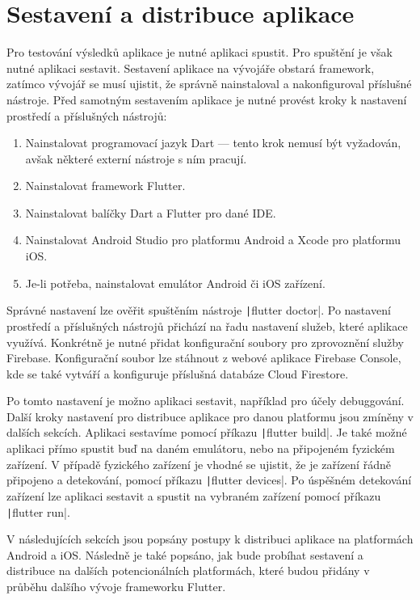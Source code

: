 \chapter{Sestavení a distribuce aplikace}
\label{chap:deployment}

Pro testování výsledků aplikace je nutné aplikaci spustit.
Pro spuštění je však nutné aplikaci sestavit.
Sestavení aplikace na vývojáře obstará framework,
zatímco vývojář se musí ujistit,
že správně nainstaloval a nakonfiguroval příslušné nástroje.
Před samotným sestavením aplikace je nutné provést kroky k nastavení prostředí
a příslušných nástrojů:

\begin{enumerate}
    \item Nainstalovat programovací jazyk Dart
    --- tento krok nemusí být vyžadován,
    avšak některé externí nástroje s ním pracují.
    \item Nainstalovat framework Flutter.
    \item Nainstalovat balíčky Dart a Flutter pro dané IDE.
    \item Nainstalovat Android Studio pro platformu Android
    a Xcode pro platformu iOS.
    \item Je-li potřeba, nainstalovat emulátor Android či iOS zařízení.
\end{enumerate}

Správné nastavení lze ověřit spuštěním nástroje
\texttt|flutter doctor|.
Po nastavení prostředí a příslušných nástrojů přichází na řadu nastavení služeb,
které aplikace využívá.
Konkrétně je nutné přidat konfigurační soubory pro zprovoznění služby Firebase.
Konfigurační soubor lze stáhnout z webové aplikace Firebase Console,
kde se také vytváří a konfiguruje příslušná databáze Cloud Firestore. 

Po tomto nastavení je možno aplikaci sestavit,
například pro účely debuggování.
Další kroky nastavení pro distribuce aplikace pro danou platformu jsou
zmíněny v dalších sekcích.
Aplikaci sestavíme pomocí příkazu \texttt|flutter build|.
Je také možné aplikaci přímo spustit buď na daném emulátoru,
nebo na připojeném fyzickém zařízení.
V případě fyzického zařízení je vhodné se ujistit,
že je zařízení řádně připojeno a detekování,
pomocí příkazu \texttt|flutter devices|.
Po úspěšném detekování zařízení lze aplikaci sestavit a spustit na vybraném
zařízení pomocí příkazu \texttt|flutter run|. 

V následujících sekcích jsou popsány postupy k distribuci aplikace na
platformách Android a iOS.
Následně je také popsáno,
jak bude probíhat sestavení a distribuce na dalších potencionálních
platformách,
které budou přidány v průběhu dalšího vývoje frameworku Flutter.




